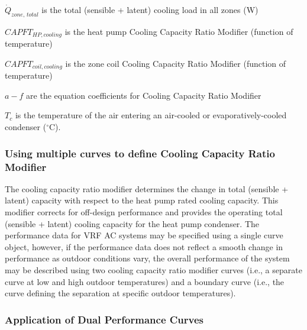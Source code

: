 \({\dot{Q}_{zone,\,total}}\) is the total (sensible + latent) cooling load in all zones (W)

\(CAPF{T_{HP,cooling}}\) is the heat pump Cooling Capacity Ratio Modifier (function of temperature)

\(CAPF{T_{coil,cooling}}\) is the zone coil Cooling Capacity Ratio Modifier (function of temperature)

\(a - f\) are the equation coefficients for Cooling Capacity Ratio Modifier

\({T_c}\) is the temperature of the air entering an air-cooled or evaporatively-cooled condenser (\(^{\circ}\)C).

\subsubsection{Using multiple curves to define Cooling Capacity Ratio Modifier}\label{using-multiple-curves-to-define-cooling-capacity-ratio-modifier}

The cooling capacity ratio modifier determines the change in total (sensible + latent) capacity with respect to the heat pump rated cooling capacity. This modifier corrects for off-design performance and provides the operating total (sensible + latent) cooling capacity for the heat pump condenser. The performance data for VRF AC systems may be specified using a single curve object, however, if the performance data does not reflect a smooth change in performance as outdoor conditions vary, the overall performance of the system may be described using two cooling capacity ratio modifier curves (i.e., a separate curve at low and high outdoor temperatures) and a boundary curve (i.e., the curve defining the separation at specific outdoor temperatures).

\subsubsection{Application of Dual Performance Curves}\label{application-of-dual-performance-curves}

